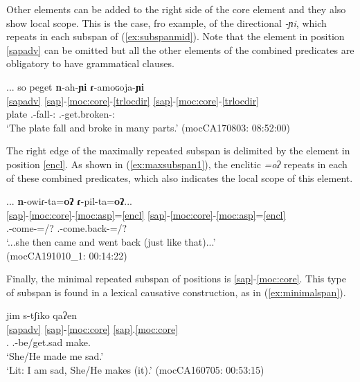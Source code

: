 \documentclass[output=paper]{langscibook}
\begin{document}
Other elements can be added to the right side of the core element and they also show local scope. This is the case, fro example, of the directional \textit{-ɲi}, which repeats in each subspan of (\ref{ex:subspanmid}). Note that the element in position \ref{sapadv} can be omitted but all the other elements of the combined predicates are obligatory to have grammatical clauses. 

\ea \label{ex:subspanmid}
	\glll ... so peget \textbf{n}-ah-\textbf{ɲi} \textbf{ɾ}-amoɢoja-\textbf{ɲi} \\
	        {} \ref{sapadv} {}   \ref{sap}-\ref{moc:core}-\ref{trlocdir} \ref{sap}-\ref{moc:core}-\ref{trlocdir} \\
	  {} {\DetTwo} {plate} {\Third.\III}-fall-{\Dir:\Down}    {\Third.\II}-get.broken-{\Dir:\Down}\\
	\glt `The plate fall and broke in many parts.' \hfill (mocCA170803: 08:52:00)
\z


The right edge of the maximally repeated  subspan is delimited by the element in position \ref{encl}. As shown in (\ref{ex:maxsubspan1}), the enclitic \textit{=oʔ} repeats in each of these combined predicates, which also indicates the local scope of this element. 

\ea \label{ex:maxsubspan1}
	\glll ... \textbf{n}-owiɾ-ta=\textbf{oʔ} \textbf{ɾ}-pil-ta=\textbf{oʔ}... \\
	      {}  \ref{sap}-\ref{moc:core}-\ref{moc:asp}=\ref{encl} \ref{sap}-\ref{moc:core}-\ref{moc:asp}=\ref{encl} \\
	    {} {\Third.\III}-come-{\Dur}={\Evid/\Tprl}?  {\Third.\II}-come.back-{\Dur}={\Evid/\Tprl}?  \\
	\glt `...she then came and went back (just like that)...' \\
	\hfill (mocCA191010\_1: 00:14:22)
\z

Finally, the minimal repeated subspan of positions is \ref{sap}-\ref{moc:core}. This type of subspan is found in a lexical causative construction, as in (\ref{ex:minimalspan}). 

\ea\label{ex:minimalspan}
\glll jim s-tʃiko qaʔen \\
\ref{sapadv} \ref{sap}-\ref{moc:core} \ref{sap}.\ref{moc:core} \\
{\First\Sg.\Pron} {\First.\II}-be/get.sad make.{\Third}\\
\glt `She/He made me sad.'\\
\glt  `Lit: I am sad, She/He makes (it).' 	\hfill(mocCA160705: 00:53:15)
\z
\end{document}
